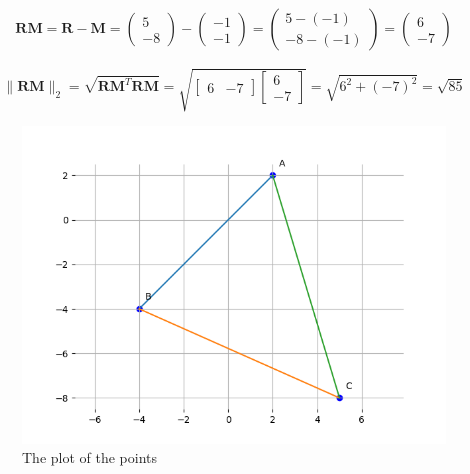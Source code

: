 \documentclass[journal]{IEEEtran}
\numberwithin{equation}{enumi}
\numberwithin{figure}{enumi}
\begin{document}
\begin{align}
\mathbf{RM} = \mathbf{R} - \mathbf{M} = \begin{pmatrix} 5 \\ -8 \end{pmatrix} - \begin{pmatrix} -1 \\ -1 \end{pmatrix} = \begin{pmatrix} 5 - (-1) \\ -8 - (-1) \end{pmatrix} = \begin{pmatrix} 6 \\ -7 \end{pmatrix}
\end{align}





\[
\| \mathbf{RM} \|_2 = \sqrt{\mathbf{RM}^T \mathbf{RM}} = \sqrt{\begin{bmatrix} 6 & -7 \end{bmatrix} \begin{bmatrix} 6 \\ -7 \end{bmatrix}} = \sqrt{6^2 + (-7)^2} = \sqrt{85}
\]





\begin{figure}[h!]
  \hspace{-1cm}
  \includegraphics[width=1.2\textwidth]{Figure_2.png}
  
  \caption{The plot of the points }
  \label{fig:your_label}
\end{figure}
\end{document}
